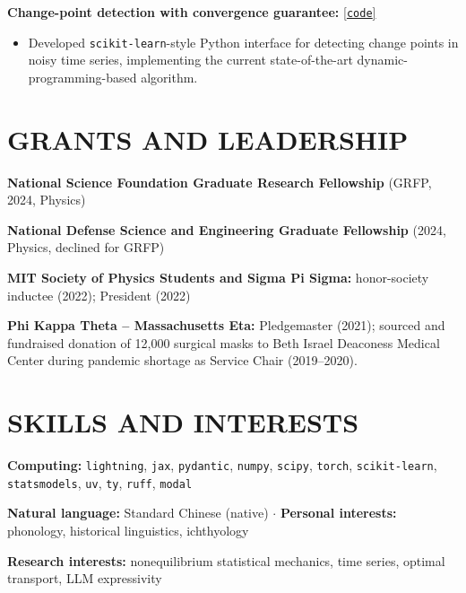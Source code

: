 \documentclass[11pt,letterpaper]{article}
\newcommand{\projectsep}{\par\vspace{2pt}}
\begin{document}
\projectsep
\textbf{Change-point detection with convergence guarantee:} \href{https://github.com/cjoshliu/py-step-detect}{[\texttt{code}]}\par
\begin{itemize}
\item Developed \texttt{scikit-learn}-style Python interface for detecting change points in noisy time series, implementing the current state-of-the-art dynamic-programming-based algorithm.
\end{itemize}

\section{GRANTS AND LEADERSHIP}
\begingroup\setlength{\parskip}{1pt}
\textbf{National Science Foundation Graduate Research Fellowship} (GRFP, 2024, Physics)\par
\textbf{National Defense Science and Engineering Graduate Fellowship} (2024, Physics, declined for GRFP)\par
\textbf{MIT Society of Physics Students and Sigma Pi Sigma:} honor-society inductee (2022); President (2022)\par
\textbf{Phi Kappa Theta -- Massachusetts Eta:} Pledgemaster (2021); sourced and fundraised donation of 12,000 surgical masks to Beth Israel Deaconess Medical Center during pandemic shortage as Service Chair (2019--2020).
\par\endgroup

\section{SKILLS AND INTERESTS}
\textbf{Computing:} \texttt{lightning}, \texttt{jax}, \texttt{pydantic}, \texttt{numpy}, \texttt{scipy}, \texttt{torch}, \texttt{scikit-learn}, \texttt{statsmodels}, \texttt{uv}, \texttt{ty}, \texttt{ruff}, \texttt{modal}\par
\textbf{Natural language:} Standard Chinese (native) $\cdot$ \textbf{Personal interests:} phonology, historical linguistics, ichthyology\par
\textbf{Research interests:} nonequilibrium statistical mechanics, time series, optimal transport, LLM expressivity\par
\end{document}
